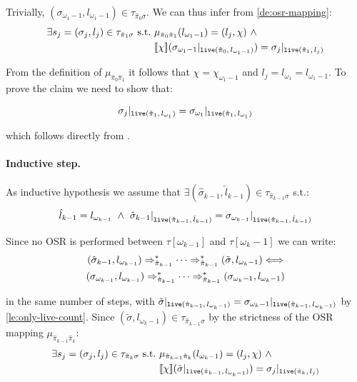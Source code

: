\begin{myproof}
\noindent Trivially, $(\sigma_{\omega_1-1},l_{\omega_1-1})\in\tau_{\hat{\pi}_0\sigma}$. We can thus infer from \ref{de:osr-mapping}:
\begin{align*}
\exists s_j=(\sigma_j,l_j)\in\tau_{\hat{\pi}_1\sigma}~\text{s.t.}~&\mu_{\hat{\pi}_{0}\hat{\pi}_1}(l_{\omega_1-1})=(l_j,\chi)~\wedge \\
&[\![\chi]\!](\sigma_{\omega_1-1}\vert_{\text{${\tt live}$}(\hat{\pi}_{0},\,l_{\omega_1-1})})=\sigma_j\vert_{\text{${\tt live}$}(\hat{\pi}_{1},\,l_j)}
\end{align*}

\noindent From the definition of $\mu_{\hat{\pi}_{0}\hat{\pi}_1}$ it follows that $\chi=\chi_{\omega_1-1}$ and $l_j=l_{\omega_1}=l_{\omega_1-1}$. To prove the claim we need to show that:

\begin{equation*}
\sigma_j\vert_{\text{${\tt live}$}(\hat{\pi}_{1},\,l_{\omega_1})}=\sigma_{\omega_1}\vert_{\text{${\tt live}$}(\hat{\pi}_{1},\,l_{\omega_1})}
\end{equation*}

\noindent which follows directly from .

\paragraph*{Inductive step.} As inductive hypothesis we assume that $\exists (\hat{\sigma}_{k-1},\hat{l}_{k-1})\in\tau_{\hat{\pi}_{k-1}\sigma}$ s.t.:
\begin{equation*}
\hat{l}_{k-1}=l_{\omega_{k-1}} ~\wedge~ \hat{\sigma}_{k-1}\vert_{\text{${\tt live}$}(\hat{\pi}_{k-1},\,\hat{l}_{k-1})}=\sigma_{\omega_{k-1}}\vert_{\text{${\tt live}$}(\hat{\pi}_{k-1},\,\hat{l}_{k-1})}
\end{equation*}

\noindent
Since no OSR is performed between $\tau[\omega_{k-1}]$ and $\tau[\omega_k-1]$ we can write:
\begin{gather*}
(\hat{\sigma}_{k-1}, l_{\omega_{k-1}}) \Rightarrow^*_{\hat{\pi}_{k-1}} \cdots \Rightarrow^*_{\hat{\pi}_{k-1}} (\tilde{\sigma},l_{\omega_k-1}) \Longleftrightarrow \\
(\sigma_{\omega_{k-1}}, l_{\omega_{k-1}}) \Rightarrow^*_{\hat{\pi}_{k-1}} \cdots \Rightarrow^*_{\hat{\pi}_{k-1}} (\sigma_{\omega_k-1},l_{\omega_k-1})
\end{gather*}

\noindent in the same number of steps, with $\tilde{\sigma}\vert_{\text{${\tt live}$}(\hat{\pi}_{k-1},\,l_{\omega_k-1})} = \sigma_{\omega_k-1}\vert_{\text{${\tt live}$}(\hat{\pi}_{k-1},\,l_{\omega_k-1})}$ by \ref{le:only-live-count}. Since $(\tilde{\sigma},l_{\omega_k-1})\in\tau_{\hat{\pi}_{k-1}\sigma}$ by the strictness of the OSR mapping $\mu_{\hat{\pi}_{k-1}\hat{\pi}_{k}}$:
\begin{align*}
\exists s_j=(\sigma_j,l_j)\in\tau_{\hat{\pi}_k\sigma}~\text{s.t.}~&\mu_{\hat{\pi}_{k-1}\hat{\pi}_{k}}(l_{\omega_k-1})=(l_j,\chi)~\wedge \\
&[\![\chi]\!](\tilde{\sigma}\vert_{\text{${\tt live}$}(\hat{\pi}_{k-1},\,l_{\omega_k-1})})=\sigma_j\vert_{\text{${\tt live}$}(\hat{\pi}_{k},\,l_j)}
\end{align*}


\end{myproof}
